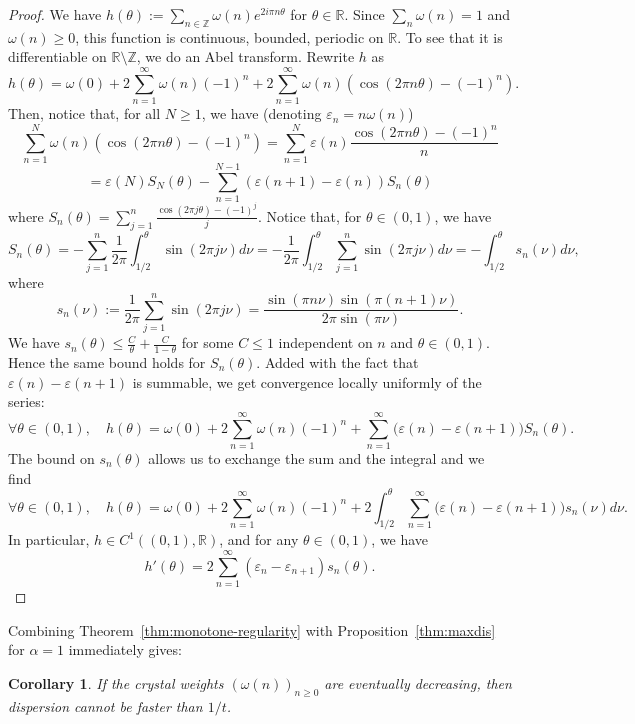 \documentclass[11pt]{amsart}
\theoremstyle{plain}
\newtheorem{corollary}[theorem]{Corollary}
\theoremstyle{definition}
\numberwithin{equation}{section}
\begin{document}
\begin{proof}
We have $h(\theta) := \sum_{n \in \mathbb{Z}} \omega(n) e^{2 i \pi n \theta}$ for $\theta \in \mathbb{R}$. Since $\sum_n \omega(n) = 1$ and $\omega(n) \geq 0$, this function is continuous, bounded, periodic on $\mathbb{R}$. To see that it is differentiable on $\mathbb{R} \setminus \mathbb{Z}$, we do an Abel transform. Rewrite $h$ as $$ h(\theta) = \omega(0) + 2\sum_{n=1}^\infty \omega(n) (-1)^n + 2 \sum_{n=1}^\infty \omega(n) (\cos(2 \pi n \theta) - (-1)^n). $$ Then, notice that, for all $N \geq 1$, we have (denoting $\varepsilon_n = n \omega(n)$)
$$  \sum_{n=1}^N \omega(n) (\cos(2 \pi n \theta)-(-1)^n) = \sum_{n=1}^N \varepsilon(n) \frac{\cos(2 \pi n \theta)-(-1)^n}{n} $$ $$= \varepsilon(N) S_N(\theta) - \sum_{n=1}^{N-1} (\varepsilon(n+1)-\varepsilon(n)) S_n(\theta) $$
where $S_n(\theta) = \sum_{j=1}^n \frac{\cos(2 \pi j \theta)-(-1)^j}{j} $. Notice that, for $\theta \in (0,1)$, we have $$S_n(\theta) = - \sum_{j=1}^n \frac{1}{2 \pi }\int_{1/2}^\theta \sin(2 \pi j \nu) d\nu = -\frac{1}{2 \pi }\int_{1/2}^\theta  \sum_{j=1}^n \sin(2 \pi j \nu) d\nu = -\int_{1/2}^\theta  s_n(\nu) d\nu, $$
where $$s_n(\nu) := \frac{1}{2\pi} \sum_{j=1}^n \sin(2 \pi j \nu) =   \frac{ \sin(\pi n \nu) \sin(\pi(n+1)\nu)}{2 \pi  \sin(\pi \nu)} .$$
We have $s_n(\theta) \leq \frac{C}{\theta} + \frac{C}{1-\theta} $ for some $C \leq 1$ independent on $n$ and $\theta \in (0,1)$. Hence the same bound holds for $S_n(\theta)$. Added with the fact that $\varepsilon(n)-\varepsilon(n+1)$ is summable, we get convergence locally uniformly of the series:
$$ \forall \theta \in (0,1), \quad h(\theta) = \omega(0) + 2\sum_{n=1}^\infty \omega(n) (-1)^n + \sum_{n=1}^\infty \Big(\varepsilon(n)-\varepsilon(n+1) \Big) S_n(\theta) .$$
The bound on $s_n(\theta)$ allows us to exchange the sum and the integral and we find
$$ \forall \theta \in (0,1), \quad h(\theta) =  \omega(0) + 2\sum_{n=1}^\infty \omega(n) (-1)^n + 2 \int_{1/2}^\theta \sum_{n=1}^\infty \Big(\varepsilon(n)-\varepsilon(n+1) \Big) s_n(\nu) d\nu . $$
In particular, $h \in C^{1}((0,1),\mathbb{R})$, and for any $\theta \in (0,1)$, we have
$$ h'(\theta) = 2 \sum_{n=1}^\infty (\varepsilon_n-\varepsilon_{n+1}) s_n(\theta) .$$\end{proof}

Combining Theorem~\ref{thm:monotone-regularity} with Proposition~\ref{thm:maxdis} for $\alpha=1$ immediately gives:

\begin{corollary}\label{cor:monotone}
If the crystal weights $(\omega(n))_{n\geq0}$ are eventually decreasing, then dispersion cannot be faster than $1/t$.
\end{corollary}
\end{document}
